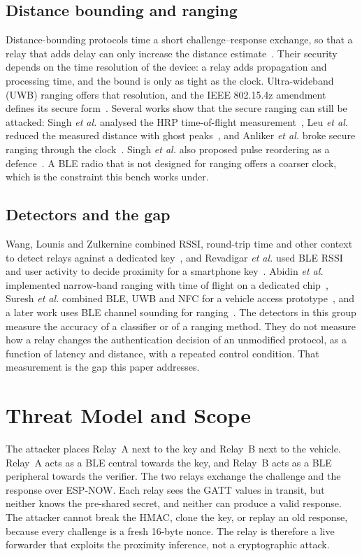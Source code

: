 \documentclass{ieeeaccess}
\begin{document}
\subsection{Distance bounding and ranging}

Distance-bounding protocols time a short challenge--response exchange, so that a relay that adds delay can only increase the distance estimate~\cite{b16,b27,b28}. Their security depends on the time resolution of the device: a relay adds propagation and processing time, and the bound is only as tight as the clock. Ultra-wideband (UWB) ranging offers that resolution, and the IEEE 802.15.4z amendment defines its secure form~\cite{b30}. Several works show that the secure ranging can still be attacked: Singh \emph{et al.} analysed the HRP time-of-flight measurement~\cite{b6}, Leu \emph{et al.} reduced the measured distance with ghost peaks~\cite{b7}, and Anliker \emph{et al.} broke secure ranging through the clock~\cite{b8}. Singh \emph{et al.} also proposed pulse reordering as a defence~\cite{b5}. A BLE radio that is not designed for ranging offers a coarser clock, which is the constraint this bench works under.

\subsection{Detectors and the gap}

Wang, Lounis and Zulkernine combined RSSI, round-trip time and other context to detect relays against a dedicated key~\cite{b22}, and Revadigar \emph{et al.} used BLE RSSI and user activity to decide proximity for a smartphone key~\cite{b23}. Abidin \emph{et al.} implemented narrow-band ranging with time of flight on a dedicated chip~\cite{b24}, Suresh \emph{et al.} combined BLE, UWB and NFC for a vehicle access prototype~\cite{b10}, and a later work uses BLE channel sounding for ranging~\cite{b26}. The detectors in this group measure the accuracy of a classifier or of a ranging method. They do not measure how a relay changes the authentication decision of an unmodified protocol, as a function of latency and distance, with a repeated control condition. That measurement is the gap this paper addresses.

\section{Threat Model and Scope}
\label{sec:threat}

The attacker places Relay~A next to the key and Relay~B next to the vehicle. Relay~A acts as a BLE central towards the key, and Relay~B acts as a BLE peripheral towards the verifier. The two relays exchange the challenge and the response over ESP-NOW. Each relay sees the GATT values in transit, but neither knows the pre-shared secret, and neither can produce a valid response. The attacker cannot break the HMAC, clone the key, or replay an old response, because every challenge is a fresh 16-byte nonce. The relay is therefore a live forwarder that exploits the proximity inference, not a cryptographic attack.
\end{document}
